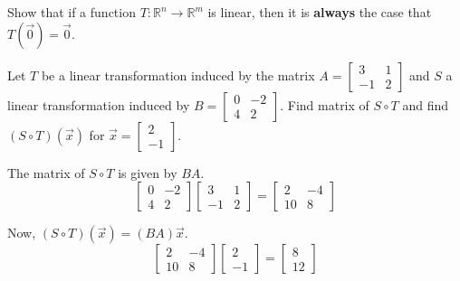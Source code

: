 \documentclass{ximera}
\begin{document}
\begin{problem}\label{prb:6.4} Show that if a function $T:\mathbb{R}^{n}\rightarrow \mathbb{R}^{m}$
is linear, then it is \textbf{always }the case that $T\left(\vec{0}\right) = \vec{0}$.
\end{problem}

\begin{problem}\label{prb:6.5} Let $T$ be a linear transformation induced by the matrix $A = \left[ \begin{array}{rr}
3 & 1 \\
-1 & 2
\end{array}\right]$ and $S$ a linear transformation induced by $B = \left[ \begin{array}{rr}
0 & -2 \\
4 & 2
\end{array}\right]$. Find matrix of $S \circ T$ and find $\left( S \circ T \right) \left( \vec{x} \right)$ for $\vec{x} = \left[ \begin{array}{r}
2 \\
-1
\end{array} \right]$.
\begin{hint}
The matrix of $S \circ T$ is given by $BA$.
\[
\left[ \begin{array}{rr}
0 & -2 \\
4 & 2
\end{array}\right] \left[ \begin{array}{rr}
3 & 1 \\
-1 & 2
\end{array}\right] = \left[
\begin{array}{rr}
2 & -4 \\
10 & 8
\end{array}
\right]
\]

Now, $\left( S \circ T \right) \left( \vec{x} \right) = (BA) \vec{x}$.
\[
 \left[
\begin{array}{rr}
2 & -4 \\
10 & 8
\end{array}
\right]
\left[ \begin{array}{r}
2 \\
-1
\end{array} \right]
=
\left[
\begin{array}{r}
8 \\
12
\end{array}
\right]
\]

\end{hint}
\end{problem}
\end{document}
